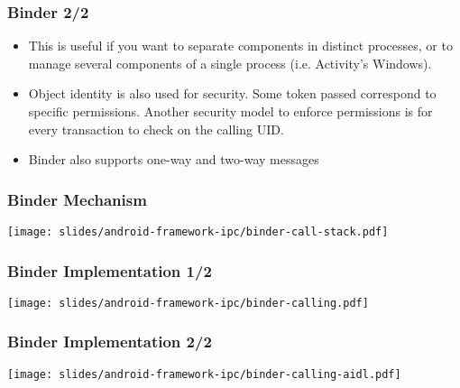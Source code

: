 \begin{frame}
  \frametitle{Binder 2/2}
  \begin{itemize}
  \item This is useful if you want to separate components in distinct
    processes, or to manage several components of a single process (i.e.
    Activity's Windows).
  \item Object identity is also used for security. Some
    token passed correspond to specific permissions. Another
    security model to enforce permissions is for every transaction to
    check on the calling UID.
  \item Binder also supports one-way and two-way messages 
  \end{itemize}
\end{frame}

\begin{frame}
  \frametitle{Binder Mechanism}
  \begin{center}
    \texttt{[image: slides/android-framework-ipc/binder-call-stack.pdf]}
  \end{center}
\end{frame}

\begin{frame}
  \frametitle{Binder Implementation 1/2}
  \begin{center}
    \texttt{[image: slides/android-framework-ipc/binder-calling.pdf]}
  \end{center}
\end{frame}

\begin{frame}
  \frametitle{Binder Implementation 2/2}
  \begin{center}
    \texttt{[image: slides/android-framework-ipc/binder-calling-aidl.pdf]}
  \end{center}
\end{frame}

